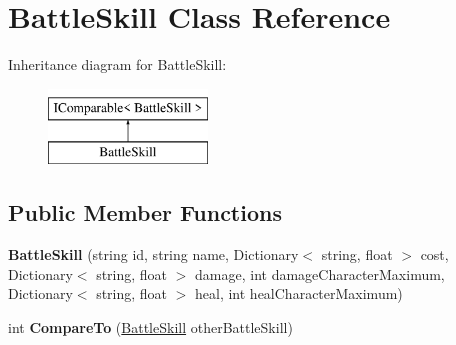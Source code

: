 \hypertarget{class_battle_skill}{}\section{Battle\+Skill Class Reference}
\label{class_battle_skill}
Inheritance diagram for Battle\+Skill\+:\begin{figure}[H]
\begin{center}
\leavevmode
\includegraphics[height=2.000000cm]{class_battle_skill}
\end{center}
\end{figure}
\subsection*{Public Member Functions}
\begin{DoxyCompactItemize}
\item 
{\bfseries Battle\+Skill} (string id, string name, Dictionary$<$ string, float $>$ cost, Dictionary$<$ string, float $>$ damage, int damage\+Character\+Maximum, Dictionary$<$ string, float $>$ heal, int heal\+Character\+Maximum)\hypertarget{class_battle_skill_a2803de068635feb8c7ed6cfc8f62d8aa}{}\label{class_battle_skill_a2803de068635feb8c7ed6cfc8f62d8aa}

\item 
int {\bfseries Compare\+To} (\hyperlink{class_battle_skill}{Battle\+Skill} other\+Battle\+Skill)\hypertarget{class_battle_skill_ae5d2634577d5a228197858fd6061e4be}{}\label{class_battle_skill_ae5d2634577d5a228197858fd6061e4be}

\end{DoxyCompactItemize}
